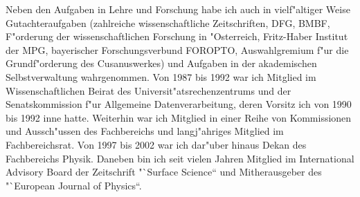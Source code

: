 Neben den Aufgaben in Lehre und Forschung habe ich auch in vielf"altiger Weise 
Gutachteraufgaben (zahlreiche wissenschaftliche Zeitschriften, DFG, BMBF, F"orderung 
der wissenschaftlichen Forschung in "Osterreich, Fritz-Haber Institut der MPG, 
bayerischer Forschungsverbund FOROPTO, Auswahlgremium f"ur die Grundf"orderung 
des Cusanuswerkes) und Aufgaben in der akademischen Selbstverwaltung wahrgenommen. 
Von 1987 bis 1992 war ich Mitglied im Wissenschaftlichen Beirat des 
Universit"atsrechenzentrums und der Senatskommission f"ur Allgemeine Datenverarbeitung, 
deren Vorsitz ich von 1990 bis 1992 inne hatte. 
Weiterhin war ich Mitglied in einer Reihe von Kommissionen und Aussch"ussen  
des Fachbereichs und langj"ahriges Mitglied im Fachbereichsrat.  
Von 1997 bis 2002 war ich dar"uber hinaus Dekan des Fachbereichs Physik. 
Daneben bin ich seit vielen Jahren Mitglied im International Advisory Board der 
Zeitschrift "`Surface Science`` und Mitherausgeber des "`European Journal of 
Physics``.



